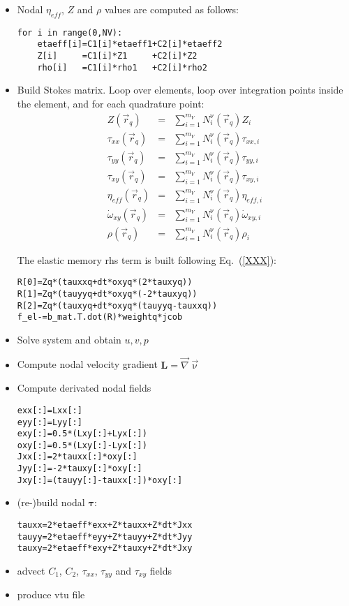\begin{itemize}
\item Nodal $\eta_{eff}$, $Z$ and $\rho$ values are computed as follows:
\begin{lstlisting}
for i in range(0,NV):
    etaeff[i]=C1[i]*etaeff1+C2[i]*etaeff2
    Z[i]     =C1[i]*Z1     +C2[i]*Z2
    rho[i]   =C1[i]*rho1   +C2[i]*rho2
\end{lstlisting}

\item Build Stokes matrix. 
Loop over elements, loop over integration points inside the element, and for 
each quadrature point:
\begin{eqnarray}
Z(\vec{r}_q) &=& \sum_{i=1}^{m_V} N_i^\upnu(\vec{r}_q) Z_i \\
\tau_{xx}(\vec{r}_q)&=& \sum_{i=1}^{m_V} N_i^\upnu(\vec{r}_q) \tau_{xx,i} \\
\tau_{yy}(\vec{r}_q)&=& \sum_{i=1}^{m_V} N_i^\upnu(\vec{r}_q) \tau_{yy,i} \\
\tau_{xy}(\vec{r}_q)&=& \sum_{i=1}^{m_V} N_i^\upnu(\vec{r}_q) \tau_{xy,i} \\
\eta_{eff}(\vec{r}_q)&=& \sum_{i=1}^{m_V} N_i^\upnu(\vec{r}_q) \eta_{eff,i} \\
\dot{\omega}_{xy}(\vec{r}_q) &=& \sum_{i=1}^{m_V} N_i^\upnu(\vec{r}_q)  \dot{\omega}_{xy,i} \\
\rho(\vec{r}_q) &=& \sum_{i=1}^{m_V} N_i^\upnu(\vec{r}_q) \rho_i 
\end{eqnarray}


The elastic memory rhs term is built following Eq.~(\ref{XXX}):
\begin{lstlisting}
R[0]=Zq*(tauxxq+dt*oxyq*(2*tauxyq))
R[1]=Zq*(tauyyq+dt*oxyq*(-2*tauxyq))
R[2]=Zq*(tauxyq+dt*oxyq*(tauyyq-tauxxq))
f_el-=b_mat.T.dot(R)*weightq*jcob
\end{lstlisting}

\item Solve system and obtain $u,v,p$

\item Compute nodal velocity gradient ${\bm L}=\vec\nabla\vec\upnu$

\item Compute derivated nodal fields 

\begin{lstlisting}
exx[:]=Lxx[:]
eyy[:]=Lyy[:]
exy[:]=0.5*(Lxy[:]+Lyx[:])
oxy[:]=0.5*(Lxy[:]-Lyx[:])
Jxx[:]=2*tauxx[:]*oxy[:]
Jyy[:]=-2*tauxy[:]*oxy[:]
Jxy[:]=(tauyy[:]-tauxx[:])*oxy[:]
\end{lstlisting}

\item (re-)build nodal ${\bm \tau}$: 
\begin{lstlisting}
tauxx=2*etaeff*exx+Z*tauxx+Z*dt*Jxx
tauyy=2*etaeff*eyy+Z*tauyy+Z*dt*Jyy
tauxy=2*etaeff*exy+Z*tauxy+Z*dt*Jxy
\end{lstlisting}

\item advect $C_1$, $C_2$, $\tau_{xx}$, $\tau_{yy}$ and $\tau_{xy}$ fields

\item produce vtu file

\end{itemize}
